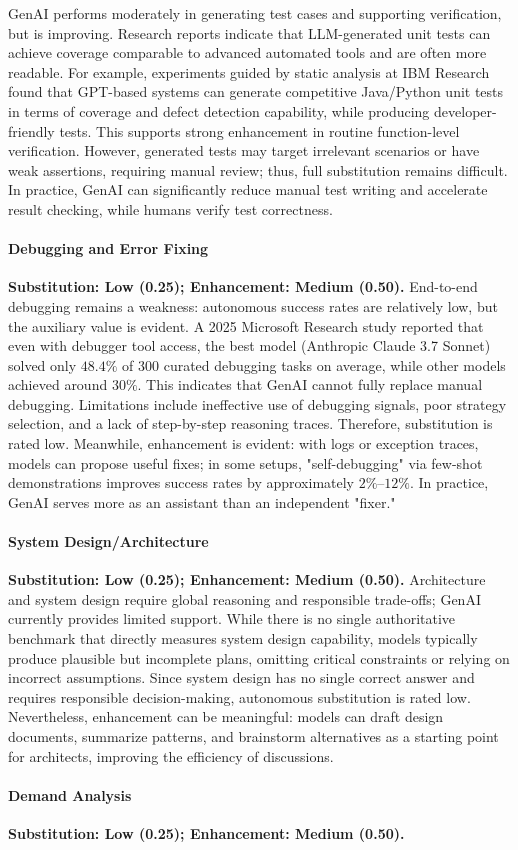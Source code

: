 GenAI performs moderately in generating test cases and supporting verification, but is improving. Research reports indicate that LLM-generated unit tests can achieve coverage comparable to advanced automated tools and are often more readable. For example, experiments guided by static analysis at IBM Research found that GPT-based systems can generate competitive Java/Python unit tests in terms of coverage and defect detection capability, while producing developer-friendly tests. This supports strong enhancement in routine function-level verification. However, generated tests may target irrelevant scenarios or have weak assertions, requiring manual review; thus, full substitution remains difficult. In practice, GenAI can significantly reduce manual test writing and accelerate result checking, while humans verify test correctness.\paragraph{Debugging and Error Fixing}\textbf{Substitution: Low (0.25); Enhancement: Medium (0.50).}
End-to-end debugging remains a weakness: autonomous success rates are relatively low, but the auxiliary value is evident. A 2025 Microsoft Research study reported that even with debugger tool access, the best model (Anthropic Claude 3.7 Sonnet) solved only $48.4\%$ of 300 curated debugging tasks on average, while other models achieved around $30\%$. This indicates that GenAI cannot fully replace manual debugging. Limitations include ineffective use of debugging signals, poor strategy selection, and a lack of step-by-step reasoning traces. Therefore, substitution is rated low. Meanwhile, enhancement is evident: with logs or exception traces, models can propose useful fixes; in some setups, "self-debugging" via few-shot demonstrations improves success rates by approximately $2\%$--$12\%$. In practice, GenAI serves more as an assistant than an independent "fixer."\paragraph{System Design/Architecture}\textbf{Substitution: Low (0.25); Enhancement: Medium (0.50).}
Architecture and system design require global reasoning and responsible trade-offs; GenAI currently provides limited support. While there is no single authoritative benchmark that directly measures system design capability, models typically produce plausible but incomplete plans, omitting critical constraints or relying on incorrect assumptions. Since system design has no single correct answer and requires responsible decision-making, autonomous substitution is rated low. Nevertheless, enhancement can be meaningful: models can draft design documents, summarize patterns, and brainstorm alternatives as a starting point for architects, improving the efficiency of discussions.\paragraph{Demand Analysis}\textbf{Substitution: Low (0.25); Enhancement: Medium (0.50).}

